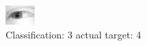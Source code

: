 \begin{figure}[h!]
\begin{center}
\includegraphics[width=0.60\columnwidth]{figures/ID2408_class_3_target_4.png}
\end{center}
\caption{ Classification: 3 actual target: 4}
\label{fig:ID2408_class_3_target_4}
\end{figure}
